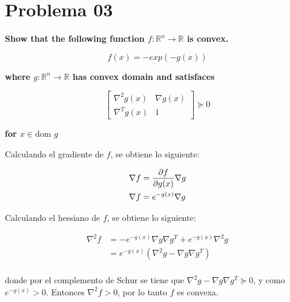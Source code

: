 \section*{Problema 03}

\textbf{Show that the following function $f: \mathbb{R}^n \rightarrow \mathbb{R}$ is convex.}

\begin{equation*}
    f(x) = -exp(-g(x))
\end{equation*}

\textbf{where $g:\mathbb{R}^n \rightarrow \mathbb{R}$ has convex domain and satisfaces}

\begin{equation*}
    \begin{bmatrix}
        \nabla^2 g(x) & \nabla g(x) \\
        \nabla^T g(x) & 1
    \end{bmatrix} \succeq 0
\end{equation*}

\textbf{for $x \in \text{dom } g$}

Calculando el gradiente de $f$, se obtiene lo siguiente:

\begin{align*}
    \nabla f & = \frac{\partial f}{\partial g(x)} \nabla g \\
    \nabla f & = e^{-g(x)} \nabla g
\end{align*}

Calculando el hessiano de $f$, se obtiene lo siguiente:

\begin{align*}
    \nabla^2 f & = -e^{-g(x)} \nabla g \nabla g^T + e^{-g(x)} \nabla^2 g   \\
               & = e^{-g(x)} \left (\nabla^2g -\nabla g\nabla g^T \right ) \\
\end{align*}

donde por el complemento de Schur se tiene que $\nabla^2g -\nabla g\nabla g^T \succeq 0$, y  como $e^{-g(x)}>0$. Entonces $\nabla^2 f>0$, por lo tanto $f$ es convexa.